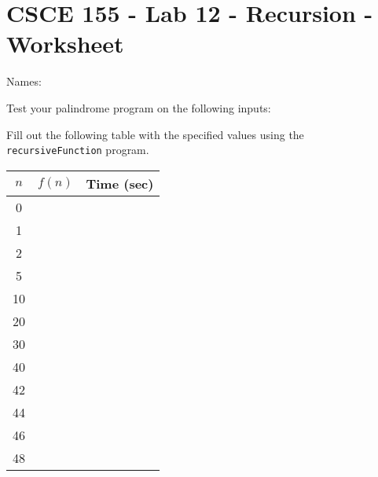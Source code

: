 \documentclass[10pt]{exam}
\begin{document}
\section*{CSCE 155 - Lab 12 - Recursion - Worksheet}

Names: \underline{\hspace{10cm}}

\begin{questions}

\question Test your palindrome program on the following inputs:

\question Fill out the following table with the specified values using the \texttt{recursiveFunction} program.

\begin{table}[h]
\centering
{\renewcommand{\arraystretch}{1.35}
\begin{tabular}{|c|p{4cm}|p{4cm}|}
\hline
$n$ & $f(n)$ & Time (sec) \\
\hline\hline
0   &        &            \\
\hline
1   &        &            \\
\hline
2   &        &            \\
\hline
5   &        &            \\
\hline
10  &        &            \\
\hline
20  &        &            \\
\hline
30  &        &            \\
\hline
40  &        &            \\
\hline
42  &        &            \\
\hline
44  &        &            \\
\hline
46  &        &            \\
\hline
48  &        &           \\
\hline
\end{tabular}
}
\end{table}


\end{questions}
\end{document}
